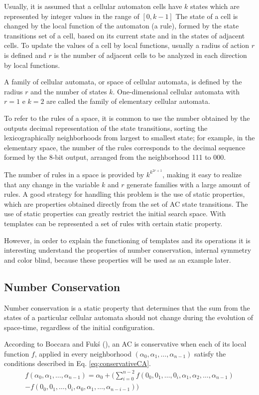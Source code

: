 \documentclass{llncs}
\begin{document}
Usually, it is assumed that a cellular automaton cells have $k$ states which are represented by integer values in the range of $[0, k-1]$ The state of a cell is changed by the local function of the automaton (a rule), formed by the state transitions set of a cell, based on its current state and in the states of adjacent cells. To update the values of a cell by local functions, usually a radius of action $r$ is defined and $r$ is the number of adjacent cells to be analyzed in each direction by local functions.

A family of cellular automata, or space of cellular automata, is defined by the radius $r$ and the number of states $k$. One-dimensional cellular automata with $r=1$ e $k=2$ are called the family of elementary cellular automata.

To refer to the rules of a space, it is common to use the number obtained by the outputs decimal representation  of the state transitions, sorting the lexicographically neighborhoods from largest to smallest state; for example, in the elementary space, the number of the rules corresponds to the decimal sequence formed by the 8-bit output, arranged from the neighborhood 111 to 000.%

The number of rules in a space is provided by $k^{k^{2r+1}}$, making it easy to realize that any change in the variable $k$ and $r$ generate families with a large amount of rules. A good strategy for handling this problem is the use of static properties, which are properties obtained directly from the set of AC state transitions. The use of static properties can greatly restrict the initial search space. With templates can be represented a set of rules with certain static property.

However, in order to explain the functioning of templates and its operations it is interesting understand the properties of number conservation, internal symmetry and color blind, because these properties will be used as an example later.

\subsection{Number Conservation}
Number conservation is a static property that determines that the sum from the states of a particular cellular automata should not change during the evolution of space-time, regardless of the initial configuration.

According to Boccara and Fukś (\cite{boccara2002}), an AC is conservative when each of its local function $f$, applied in every neighborhood $(\alpha_0,\alpha_1, \dots, \alpha_{n-1})$ satisfy the conditions described in Eq. \ref{eq:conservativeCA}.
\begin{equation}
\begin{split}
f(\alpha_0,\alpha_1, \dots,\alpha_{n-1}) = \alpha_0 + (\sum_{i=0}^{n-2}f(0_0,0_1, \dots,0_i,\alpha_1,\alpha_2, \dots,\alpha_{n-1}) \\- f(0_0,0_1, \dots,0_i,\alpha_0,\alpha_1, \dots,\alpha_{n-i-1}))
\label{eq:conservativeCA}
\end{split}
\end{equation}
\end{document}
